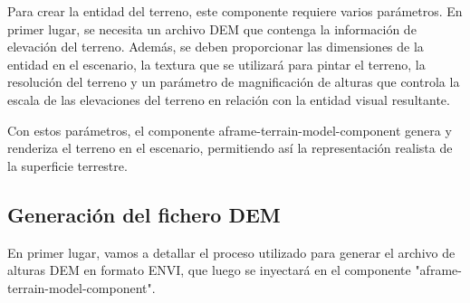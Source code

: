 \documentclass[a4paper, 11pt]{book}
\begin{document}
Para crear la entidad del terreno, este componente requiere varios parámetros. En primer lugar, se necesita un archivo DEM que contenga la información de elevación del terreno. Además, se deben proporcionar las dimensiones de la entidad en el escenario, la textura que se utilizará para pintar el terreno, la resolución del terreno y un parámetro de magnificación de alturas que controla la escala de las elevaciones del terreno en relación con la entidad visual resultante.

Con estos parámetros, el componente aframe-terrain-model-component genera y renderiza el terreno en el escenario, permitiendo así la representación realista de la superficie terrestre.
\subsection{Generación del fichero DEM}
\label{sec:dem}
En primer lugar, vamos a detallar el proceso utilizado para generar el archivo de alturas DEM en formato ENVI, que luego se inyectará en el componente "aframe-terrain-model-component".
\end{document}
